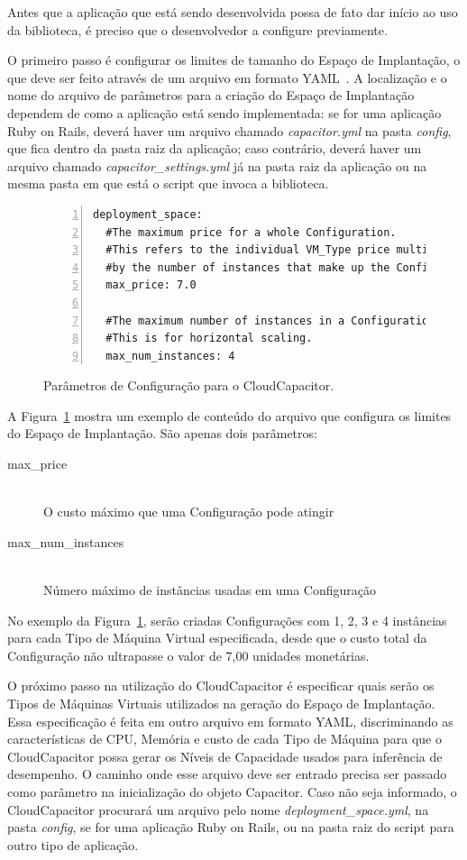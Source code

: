 Antes que a aplicação que está sendo desenvolvida possa de fato dar início ao uso 
da biblioteca, é preciso que o desenvolvedor a configure previamente. 

O primeiro passo é configurar os limites de tamanho do Espaço de Implantação, o que deve ser feito através de um arquivo em formato YAML~\cite{yml}. A localização 
e o nome do arquivo de parâmetros para a criação do Espaço de Implantação dependem 
de como a aplicação está sendo implementada: se for uma aplicação Ruby on Rails, 
deverá haver um arquivo chamado \emph{capacitor.yml} na pasta \emph{config}, que 
fica dentro da pasta raiz da aplicação; caso contrário, deverá haver um arquivo 
chamado \emph{capacitor\_settings.yml} já na pasta raiz da aplicação ou na mesma 
pasta em que está o script que invoca a biblioteca. 

\begin{figure}[t]
 \begin{lstlisting}[linewidth=\textwidth,xleftmargin=.04\textwidth, numbers=left]
deployment_space:
  #The maximum price for a whole Configuration.
  #This refers to the individual VM_Type price multiplied 
  #by the number of instances that make up the Configuration
  max_price: 7.0

  #The maximum number of instances in a Configuration. 
  #This is for horizontal scaling.
  max_num_instances: 4
  \end{lstlisting}
  \caption{\label{fig:settings}Parâmetros de Configuração para o CloudCapacitor.}
\end{figure}

A Figura~\ref{fig:settings} mostra um exemplo de conteúdo do arquivo que configura
os limites do Espaço de Implantação. São apenas dois parâmetros:

\begin{description}
  \item[max\_price] \hfill \\ O custo máximo que uma Configuração pode atingir
  \item[max\_num\_instances] \hfill \\ Número máximo de instâncias usadas em uma Configuração 
\end{description}

No exemplo da Figura~\ref{fig:settings}, serão criadas Configurações com 1, 2, 3 e 4 instâncias para cada
Tipo de Máquina Virtual especificada, desde que o custo total da Configuração não
ultrapasse o valor de 7,00 unidades monetárias.

O próximo passo na utilização do CloudCapacitor é especificar quais serão os Tipos
de Máquinas Virtuais utilizados na geração do Espaço de Implantação. Essa 
especificação é feita em outro arquivo em formato YAML, discriminando as 
características de CPU, Memória e custo de cada Tipo de Máquina para que o
CloudCapacitor possa gerar os Níveis de Capacidade usados para inferência de
desempenho. O caminho onde esse arquivo deve ser entrado precisa ser passado 
como parâmetro na inicialização do objeto Capacitor. Caso não seja informado, o 
CloudCapacitor procurará um arquivo pelo nome \emph{deployment\_space.yml}, na
pasta \emph{config}, se for uma aplicação Ruby on Rails, ou na pasta raiz do
script para outro tipo de aplicação.
 
